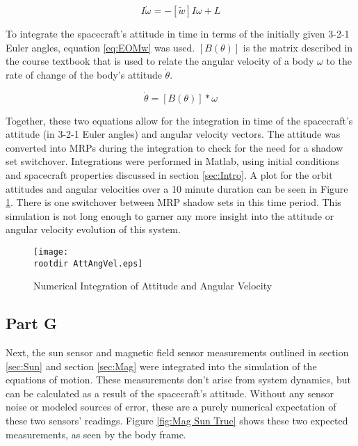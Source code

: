 \documentclass[11pt]{aiaa-tc}%
\newcommand{\rootdir}{./Figures/}
\begin{document}
\begin{equation}
	\label{eq:EOM}
	I\dot{\omega} = -[\tilde{w}] I \omega + L
\end{equation}

To integrate the spacecraft's attitude in time in terms of the initially given 3-2-1 Euler angles, equation \ref{eq:EOMw} was used. $[B(\theta)] $ is the matrix described in the course textbook\cite{schaub2003analytical} that is used to relate the angular velocity of a body $\omega$ to the rate of change of the body's attitude $\dot{\theta}$. 

\begin{equation}
	\label{eq:EOMw}
	\dot{\theta} =[B(\theta)] * \omega
\end{equation}

Together, these two equations allow for the integration in time of the spacecraft's attitude (in 3-2-1 Euler angles) and angular velocity vectors. The attitude was converted into MRPs during the integration to check for the need for a shadow set switchover. Integrations were performed in Matlab, using initial conditions and spacecraft properties discussed in section \ref{sec:Intro}. A plot for the orbit attitudes and angular velocities over a 10 minute duration can be seen in Figure \ref{fig:Attitude and Angular Velocity}. There is one switchover between MRP shadow sets in this time period. This simulation is not long enough to garner any more insight into the attitude or angular velocity evolution of this system. 

\begin{centering}
	\begin{figure}[Hh]
		\texttt{[image: \\rootdir AttAngVel.eps]}
		\caption{Numerical Integration of Attitude and Angular Velocity}
		\label{fig:Attitude and Angular Velocity}
	\end{figure}
\end{centering}




\subsection{Part G}
\label{sec:Mag Sun Truth}
Next, the sun sensor and magnetic field sensor measurements outlined in section \ref{sec:Sun} and section \ref{sec:Mag} were integrated into the simulation of the equations of motion. These measurements don't arise from system dynamics, but can be calculated as a result of the spacecraft's attitude. Without any sensor noise or modeled sources of error, these are a purely numerical expectation of these two sensors' readings. Figure \ref{fig:Mag Sun True} shows these two expected measurements, as seen by the body frame. 
\end{document}
